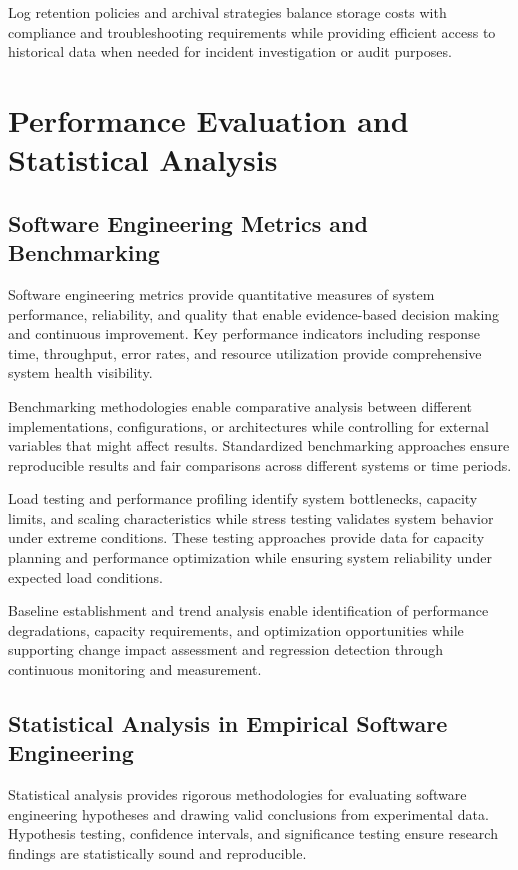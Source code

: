 Log retention policies and archival strategies balance storage costs with compliance and troubleshooting requirements while providing efficient access to historical data when needed for incident investigation or audit purposes.

\section{Performance Evaluation and Statistical Analysis}

\subsection{Software Engineering Metrics and Benchmarking}

Software engineering metrics provide quantitative measures of system performance, reliability, and quality that enable evidence-based decision making and continuous improvement. Key performance indicators including response time, throughput, error rates, and resource utilization provide comprehensive system health visibility.

Benchmarking methodologies enable comparative analysis between different implementations, configurations, or architectures while controlling for external variables that might affect results. Standardized benchmarking approaches ensure reproducible results and fair comparisons across different systems or time periods.

Load testing and performance profiling identify system bottlenecks, capacity limits, and scaling characteristics while stress testing validates system behavior under extreme conditions. These testing approaches provide data for capacity planning and performance optimization while ensuring system reliability under expected load conditions.

Baseline establishment and trend analysis enable identification of performance degradations, capacity requirements, and optimization opportunities while supporting change impact assessment and regression detection through continuous monitoring and measurement.

\subsection{Statistical Analysis in Empirical Software Engineering}

Statistical analysis provides rigorous methodologies for evaluating software engineering hypotheses and drawing valid conclusions from experimental data. Hypothesis testing, confidence intervals, and significance testing ensure research findings are statistically sound and reproducible.

